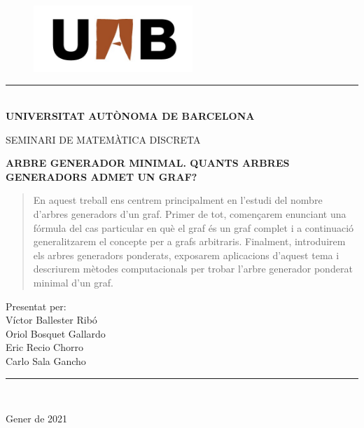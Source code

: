 \documentclass{article}
\begin{document}
\begin{titlepage}
\begin{center}
\vspace*{0in}
\begin{figure}[H]
    \begin{center}
    \includegraphics[width=6cm]{imatges/uab.jpg}
    \end{center}
\end{figure}
\rule{130mm}{0.1mm}\\
\Large{\textbf{UNIVERSITAT AUTÒNOMA DE BARCELONA}} \\
\vspace*{0.5in}
\begin{large}
SEMINARI DE MATEMÀTICA DISCRETA \\
\end{large}
\vspace*{1in}
\begin{LARGE}
\textbf{ARBRE GENERADOR MINIMAL. QUANTS ARBRES GENERADORS ADMET UN GRAF?} \\
\end{LARGE}
\vspace*{1in}
\begin{abstract}
    En aquest treball ens centrem principalment en l'estudi del nombre d'arbres generadors d'un graf. Primer de tot, començarem enunciant una fórmula del cas particular en què el graf és un graf complet i a continuació ge\-ne\-ra\-lit\-za\-rem el concepte per a grafs arbitraris. Finalment, introduirem els arbres generadors ponderats, exposarem aplicacions d'aquest tema i descriurem mètodes computacionals per trobar l'arbre generador ponderat minimal d'un graf. 
\end{abstract}
\vspace*{1.3in}
\begin{large}
Presentat per:\\
\vspace*{0.1in}
Víctor Ballester Ribó \\
Oriol Bosquet Gallardo\\
Eric Recio Chorro\\
Carlo Sala Gancho\\
\end{large}
\vspace*{0.2in}
\rule{80mm}{0.1mm}\\
\vspace*{0.1in}
\begin{large}
Gener de 2021
\end{large}
\end{center}
\newpage
\end{titlepage}
\newpage
\tableofcontents
\newpage
\end{document}
